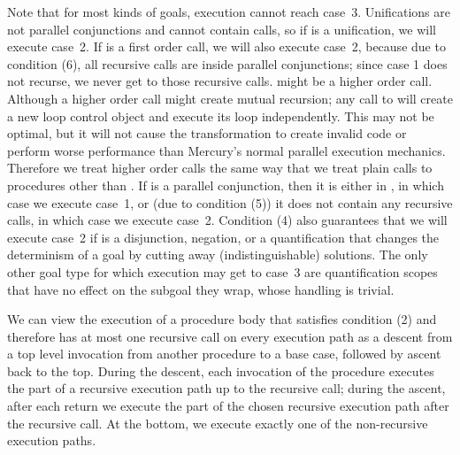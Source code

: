 
Note that for most kinds of goals, execution cannot reach case~3.
Unifications are not parallel conjunctions and cannot contain calls,
so if  is a unification, we will execute case~2.
If  is a first order call, we will also execute case~2,
because due to condition (6),
all recursive calls are inside parallel conjunctions;
since case 1 does not recurse,
we never get to those recursive calls.
 might be a higher order call.
Although a higher order call might create mutual recursion;
any call to  will create a new loop control object and execute
its loop independently.
This may not be optimal, but it will not cause the transformation to create
invalid code or perform worse performance than Mercury's normal parallel
execution mechanics.
Therefore we treat higher order calls the same way that we treat plain calls
to procedures other than .
If  is a parallel conjunction,
then it is either in ,
in which case we execute case~1,
or (due to condition (5))
it does not contain any recursive calls,
in which case we execute case~2.
Condition (4) also guarantees that we will execute case~2
if  is a disjunction, negation,
or a quantification that changes the determinism of a goal
by cutting away (indistinguishable) solutions.
The only other goal type for which execution may get to case~3
are quantification scopes that have no effect on the subgoal they wrap,
whose handling is trivial.

We can view the execution of a procedure body that satisfies condition (2)
and therefore has at most one recursive call on every execution path
as a descent from a top level invocation from another procedure
to a base case, followed by ascent back to the top.
During the descent,
each invocation of the procedure executes
the part of a recursive execution path
up to the recursive call;
during the ascent,
after each return we execute
the part of the chosen recursive execution path after the recursive call.
At the bottom, we execute exactly one of the non-recursive execution paths.

